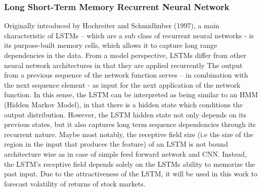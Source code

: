 \documentclass[a4paper,11pt,oneside]{book}
\begin{document}
\subsubsection{Long Short-Term Memory Recurrent Neural Network}
Originally introduced by Hochreiter and Schmidhuber (1997), a main characteristic of LSTMs – which are a sub class of recurrent neural networks - is its purpose-built memory cells, which allows it to capture long range dependencies in the data. From a model perspective, LSTMs differ from other neural network architectures in that they are applied recurrently\newline\newline
The output from a previous sequence of the network function serves – in combination with the next sequence element - as input for the next application of the network function. In this sense, the LSTM can be interpreted as being similar to an HMM (Hidden Markov Model), in that there is a hidden state which conditions the output distribution. However, the LSTM hidden state not only depends on its previous states, but it also captures long term sequence dependencies through its recurrent nature. Maybe most notably, the receptive field size (i.e the size of the region in the input that produces the feature) of an LSTM is not bound architecture wise as in case of simple feed forward network and CNN. Instead, the LSTM’s receptive field depends solely on the LSTMs ability to memorize the past input. Due to the attractiveness of the LSTM, it will be used in this work to forecast volatility of returns of stock markets. \newline\newline
\end{document}
